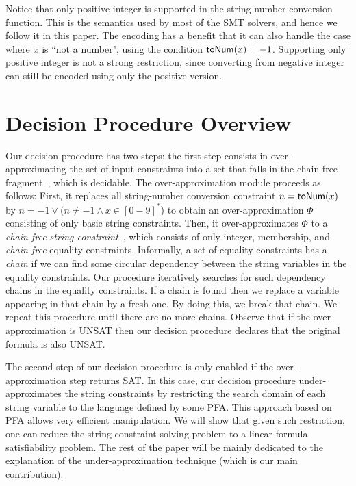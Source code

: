 \documentclass[sigplan,screen]{acmart}
\begin{document}
Notice that only positive integer is supported in the string-number conversion function. This is the semantics used by most of the SMT solvers, and hence we follow it in this paper. The encoding has a benefit that it can also handle the case where $x$ is ``not a number", using the condition $\mbox{\textsf{toNum}($x$)} = -1$.
Supporting only positive integer is not a strong restriction, since converting from negative integer can still be encoded using only the positive  version. 


\section{Decision Procedure Overview} \label{section:over}


Our decision procedure has two steps: the first step consists in over-approximating the set of input constraints into a set that falls in the chain-free fragment~\cite{abdulla2019chain}, which is decidable. 
The over-approximation module proceeds as follows: First,  it replaces all string-number conversion constraint $n=\mbox{\textsf{toNum}($x$)}$ by $n=-1 \vee (n\neq -1 \wedge x\in [0-9]^*$) to obtain an over-approximation $\Phi$ consisting of only basic string constraints. 
Then, it over-approximates $\Phi$ to a \emph{chain-free string constraint}~\cite{abdulla2019chain}, 
which  consists of only integer, membership, and \emph{chain-free} equality constraints. Informally, a set of equality constraints has a \emph{chain} if we can find some circular dependency between the string variables in the equality constraints.
Our procedure iteratively searches for such dependency chains in the equality constraints. If a chain is found then we replace a variable appearing in that chain by a  fresh one. By doing this, we  break  that chain. We   repeat this procedure until there are no more chains. Observe that if the over-approximation is UNSAT then our decision procedure  declares that the original formula is also UNSAT.




The second step of our decision procedure is only enabled if the over-approximation step returns SAT. In this case, our decision procedure  under-approximates the string constraints by restricting the search domain of each string variable to the language defined by some PFA. This approach based on PFA allows very efficient manipulation. We will show that given such restriction, one can reduce the string constraint solving problem to a linear formula satisfiability problem. The rest of the paper will be mainly dedicated to the explanation of the under-approximation technique (which is our main contribution).
\end{document}
